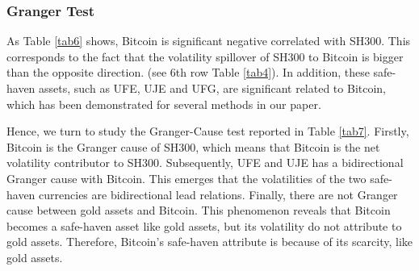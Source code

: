 \documentclass[review]{elsarticle}
\begin{document}
\begin{table}[]
	\centering
	\setlength{\abovecaptionskip}{0pt}%
	\setlength{\belowcaptionskip}{10pt}%
	\caption{Correlation of Dynamic correlation produced by two methods}
	\renewcommand\tabcolsep{30 pt}
	\label{tab5}
\end{table}

\subsubsection{Granger Test}
As Table \ref{tab6} shows, Bitcoin is significant negative correlated with SH300. This corresponds to the fact that the volatility spillover of SH300 to Bitcoin is bigger than the opposite direction. (see 6th row Table \ref{tab4}). In addition, these safe-haven assets, such as UFE, UJE and UFG, are significant related to Bitcoin, which has been demonstrated for several methods in our paper.

\begin{table}[]
	\centering
	\setlength{\abovecaptionskip}{0pt}%
	\setlength{\belowcaptionskip}{10pt}%
	\caption{Correlation of Daily Volatility}
	\renewcommand\tabcolsep{5 pt}
	\label{tab6}
\end{table}


Hence, we turn to study the Granger-Cause test reported in Table \ref{tab7}. Firstly, Bitcoin is the Granger cause of SH300, which means that Bitcoin is the net volatility contributor to SH300. Subsequently, UFE and UJE has a bidirectional Granger cause with Bitcoin. This emerges that the volatilities of the two safe-haven currencies are bidirectional lead relations. Finally, there are not Granger cause between gold assets and Bitcoin. This phenomenon reveals that Bitcoin becomes a safe-haven asset like gold assets, but its volatility do not attribute to gold assets. Therefore, Bitcoin's safe-haven attribute is because of its scarcity, like gold assets.
\end{document}
